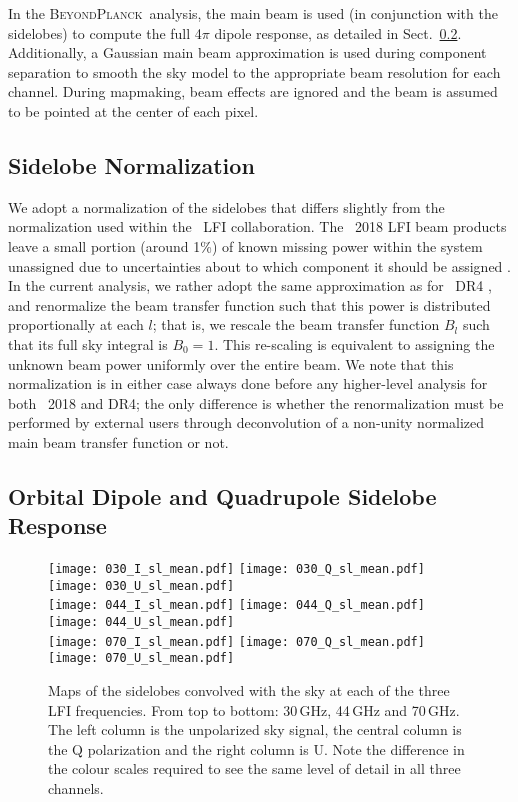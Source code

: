 \documentclass[twocolumn]{aa}
\newcommand{\BP}{\textsc{BeyondPlanck}}
\begin{document}
In the \BP\ analysis, the main beam is used (in conjunction with the sidelobes) to compute the full 4$\pi$ dipole response, as detailed in Sect.~\ref{sec:dipole}. Additionally, a Gaussian main beam approximation is used during component separation to smooth the sky model to the appropriate beam resolution for each channel. During mapmaking, beam effects are ignored and the beam is assumed to be pointed at the center of each pixel. 

\subsection{Sidelobe Normalization}
\label{sec:normalization}

We adopt a normalization of the sidelobes that differs slightly from the normalization used within the \Planck\ LFI collaboration. The \Planck\ 2018 LFI beam products leave a small portion (around 1\%) of known missing power within the system unassigned due to uncertainties about to which component it should be assigned \citep{planck2014-a05}. In the current analysis, we rather adopt the same approximation as for \Planck\ DR4 \citep{npipe}, and renormalize the beam transfer function such that this power is distributed proportionally at each $l$; that is, we rescale the beam transfer function $B_l$ such that its full sky integral is $B_0 = 1$. This re-scaling is equivalent to assigning the unknown beam power uniformly over the entire beam. We note that this normalization is in either case always done before any higher-level analysis for both \Planck\ 2018 and DR4; the only difference is whether the renormalization must be performed by external users through deconvolution of a non-unity normalized main beam transfer function or not. 

\subsection{Orbital Dipole and Quadrupole Sidelobe Response}
\label{sec:dipole}

\begin{figure*}[t]
  \center
  \texttt{[image: 030\_I\_sl\_mean.pdf]}
  \texttt{[image: 030\_Q\_sl\_mean.pdf]}
  \texttt{[image: 030\_U\_sl\_mean.pdf]}\\
    \texttt{[image: 044\_I\_sl\_mean.pdf]}
  \texttt{[image: 044\_Q\_sl\_mean.pdf]}
  \texttt{[image: 044\_U\_sl\_mean.pdf]}\\
    \texttt{[image: 070\_I\_sl\_mean.pdf]}
  \texttt{[image: 070\_Q\_sl\_mean.pdf]}
  \texttt{[image: 070\_U\_sl\_mean.pdf]}\\
  \caption{Maps of the sidelobes convolved with the sky at each of the three LFI frequencies. From top to bottom: 30\,GHz, 44\,GHz and 70\,GHz. The left column is the unpolarized sky signal, the central column is the Q polarization and the right column is U. Note the difference in the colour scales required to see the same level of detail in all three channels. 
  }\label{fig:slmean}
\end{figure*}
\end{document}
